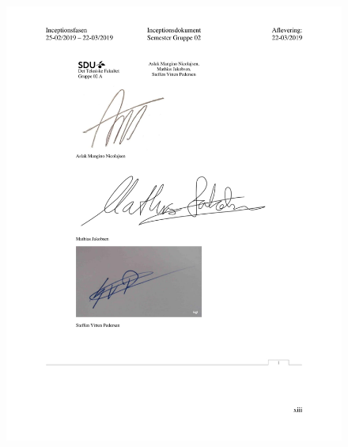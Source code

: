\begin{figure}[hb]
  \includegraphics[scale = 0.33]{./PNG/Inceptions/Gruppe 02 + InceptionsDokument-46.jpg} 
\end{figure}

